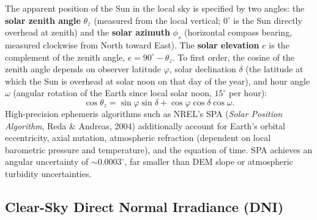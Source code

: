 \documentclass[11pt,a4paper]{article}
\begin{document}
The apparent position of the Sun in the local sky is specified by two angles: the \textbf{solar zenith angle} $\theta_z$ (measured from the local vertical; $0^\circ$ is the Sun directly overhead at zenith) and the \textbf{solar azimuth} $\phi_s$ (horizontal compass bearing, measured clockwise from North toward East). The \textbf{solar elevation} $e$ is the complement of the zenith angle, $e = 90^\circ-\theta_z$. To first order, the cosine of the zenith angle depends on observer latitude $\varphi$, solar declination $\delta$ (the latitude at which the Sun is overhead at solar noon on that day of the year), and hour angle $\omega$ (angular rotation of the Earth since local solar noon, $15^\circ$ per hour):
\begin{equation}
  \cos\theta_z=\sin\varphi\sin\delta+\cos\varphi\cos\delta\cos\omega .
  \label{eq:cenit}
\end{equation}
High-precision ephemeris algorithms such as NREL's SPA (\emph{Solar Position Algorithm}, Reda \& Andreas, 2004) additionally account for Earth's orbital eccentricity, axial nutation, atmospheric refraction (dependent on local barometric pressure and temperature), and the equation of time. SPA achieves an angular uncertainty of $\sim 0.0003^\circ$, far smaller than DEM slope or atmospheric turbidity uncertainties.

\subsection{Clear-Sky Direct Normal Irradiance (DNI)}
\end{document}
